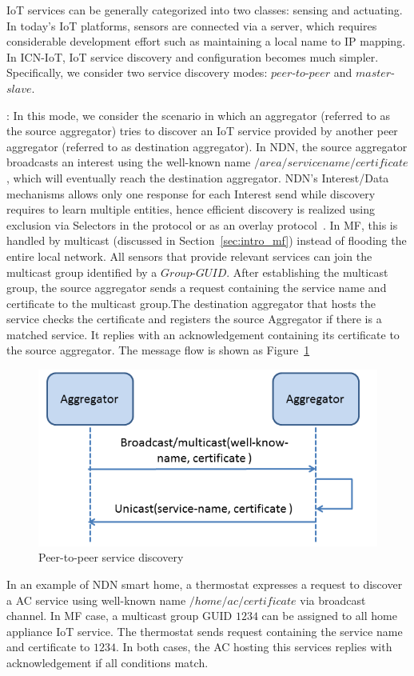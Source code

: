 IoT services can be generally categorized into two classes: sensing and actuating. In today's IoT platforms, sensors are connected via a server, which requires considerable development effort such as maintaining a local name to IP mapping. In ICN-IoT, IoT service discovery and configuration becomes much simpler. Specifically, we consider two service discovery modes: $peer$-$to$-$peer$ and $master$-$slave$.


\vspace{1mm}: In this mode, we consider the scenario in which an aggregator (referred to as the source aggregator) tries to discover an IoT service provided by another peer aggregator (referred to as destination aggregator). In NDN, the source aggregator broadcasts an interest using the well-known name $/area/servicename/certificate$, which will eventually reach the destination aggregator. NDN's Interest/Data mechanisms allows only one response for each Interest send while discovery requires to learn multiple entities, hence efficient discovery is realized using exclusion via Selectors in the protocol or as an overlay protocol~\cite{ravindran2013information}. In MF, this is handled by multicast (discussed in Section~\ref{sec:intro_mf}) instead of flooding the entire local network. All sensors that provide relevant services can join the multicast group identified by a $Group$-$GUID$. After establishing the multicast group, the source aggregator sends a request containing the service name and certificate to the multicast group.The destination aggregator that hosts the service checks the certificate and registers the source Aggregator if there is a matched service. It replies with an acknowledgement containing its certificate to the source aggregator. The message flow is shown as Figure~\ref{fig:ser_dis}
\begin{figure}
\includegraphics[width=\columnwidth]{figure/service_discovery.png}
\caption{\label{fig:ser_dis}Peer-to-peer service discovery}
\end{figure}
In an example of NDN smart home, a thermostat expresses a request to discover a AC service using well-known name $/home/ac/certificate$ via broadcast channel. In MF case, a multicast group GUID $1234$ can be assigned to all home appliance IoT service. The thermostat sends request containing the service name and certificate to $1234$. In both cases, the AC hosting this services replies with acknowledgement if all conditions match.

